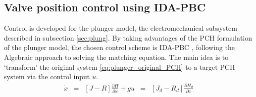 \documentclass[letterpaper, 10pt, conference]{ieeeconf}
\begin{document}
\subsection{Valve position control using IDA-PBC}
Control is developed for the plunger model, the electromechanical subsystem described in subsection \ref{sec:plung}.
By taking advantages of the PCH formulation of the plunger model, the chosen control scheme is IDA-PBC \cite{IDAPBC}, following the Algebraic approach to solving the matching equation. The main idea is to `transform' the original system \eqref{eq:plunger_original_PCH} to a target PCH system via the control input $u$. 
\begin{equation}
    \begin{aligned}
    \dot{x} &=& [J-R]\frac{\partial H}{\partial x} + gu &=& [J_{d}- R_{d}]\frac{\partial H_{d}}{\partial x}
\end{aligned}\label{eq:IDA_principle}
\end{equation}
\end{document}
